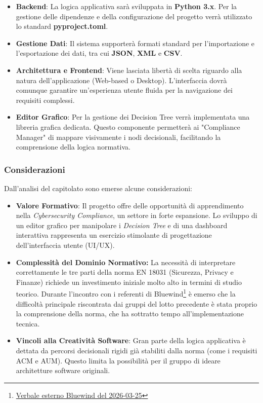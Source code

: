 \documentclass[a4paper, 10pt, colorlinks=true, linkcolor=black, urlcolor=blue, citecolor=blue, hidelinks]{article}
\begin{document}
\begin{itemize}
    \item \textbf{Backend}: La logica applicativa sarà sviluppata in \textbf{Python 3.x}. Per la gestione delle dipendenze e della configurazione del progetto verrà utilizzato lo standard \textbf{pyproject.toml}.
    
    \item \textbf{Gestione Dati}: Il sistema supporterà formati standard per l'importazione e l'esportazione dei dati, tra cui \textbf{JSON}, \textbf{XML} e \textbf{CSV}.
    
    \item \textbf{Architettura e Frontend}: Viene lasciata libertà di scelta riguardo alla natura dell'applicazione (Web-based o Desktop). L'interfaccia dovrà comunque garantire un'esperienza utente fluida per la navigazione dei requisiti complessi.
    
    \item \textbf{Editor Grafico}: Per la gestione dei Decision Tree verrà implementata una libreria grafica dedicata. Questo componente permetterà ai "Compliance Manager" di mappare visivamente i nodi decisionali, facilitando la comprensione della logica normativa.
\end{itemize}

\subsubsection{Considerazioni}

Dall'analisi del capitolato sono emerse alcune considerazioni:

\begin{itemize}
    \item \textbf{Valore Formativo}: Il progetto offre delle opportunità di apprendimento nella \textit{Cybersecurity Compliance}, un settore in forte espansione. Lo sviluppo di un editor grafico per manipolare i \textit{Decision Tree} e di una dashboard interattiva rappresenta un esercizio stimolante di progettazione dell'interfaccia utente (UI/UX).
    \item \textbf{Complessità del Dominio Normativo:} La necessità di interpretare correttamente le tre parti della norma EN 18031 (Sicurezza, Privacy e Finanze) richiede un investimento iniziale molto alto in termini di studio teorico. Durante l'incontro con i referenti di Bluewind\footnote{\href{https://github.com/thebitless-group-swe/thebitless.github.io/blob/main/candidatura/verbali/verbali_esterni/VE_2026-03-25_Bluewind/VE_2026-03-25_Bluewind.pdf}{Verbale esterno Bluewind del 2026-03-25}} è emerso che la difficoltà principale riscontrata dai gruppi del lotto precedente è stata proprio la comprensione della norma, che ha sottratto tempo all'implementazione tecnica.
    \item \textbf{Vincoli alla Creatività Software}: Gran parte della logica applicativa è dettata da percorsi decisionali rigidi già stabiliti dalla norma (come i requisiti ACM e AUM). Questo limita la possibilità per il gruppo di ideare architetture software originali.
\end{itemize}
\end{document}
